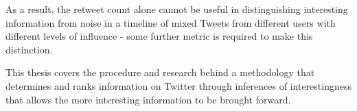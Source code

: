 As a result, the retweet count alone cannot be useful in distinguishing interesting information from noise in a timeline of mixed Tweets from different users with different levels of influence - some further metric is required to make this distinction. 

This thesis covers the procedure and research behind a methodology that determines and ranks information on Twitter through inferences of interestingness that allows the more interesting information to be brought forward. 
